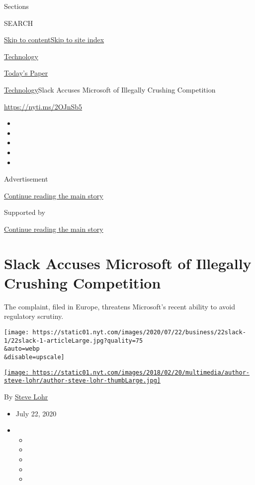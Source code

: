 Sections

SEARCH

\protect\hyperlink{site-content}{Skip to
content}\protect\hyperlink{site-index}{Skip to site index}

\href{https://www.nytimes.com/section/technology}{Technology}

\href{https://myaccount.nytimes.com/auth/login?response_type=cookie\&client_id=vi}{}

\href{https://www.nytimes.com/section/todayspaper}{Today's Paper}

\href{/section/technology}{Technology}\textbar{}Slack Accuses Microsoft
of Illegally Crushing Competition

\url{https://nyti.ms/2OJnSb5}

\begin{itemize}
\item
\item
\item
\item
\item
\end{itemize}

Advertisement

\protect\hyperlink{after-top}{Continue reading the main story}

Supported by

\protect\hyperlink{after-sponsor}{Continue reading the main story}

\hypertarget{slack-accuses-microsoft-of-illegally-crushing-competition}{%
\section{Slack Accuses Microsoft of Illegally Crushing
Competition}\label{slack-accuses-microsoft-of-illegally-crushing-competition}}

The complaint, filed in Europe, threatens Microsoft's recent ability to
avoid regulatory scrutiny.

\texttt{[image: https://static01.nyt.com/images/2020/07/22/business/22slack-1/22slack-1-articleLarge.jpg?quality=75\\\&auto=webp\\\&disable=upscale]}

\href{https://www.nytimes.com/by/steve-lohr}{\texttt{[image: https://static01.nyt.com/images/2018/02/20/multimedia/author-steve-lohr/author-steve-lohr-thumbLarge.jpg]}}

By \href{https://www.nytimes.com/by/steve-lohr}{Steve Lohr}

\begin{itemize}
\item
  July 22, 2020
\item
  \begin{itemize}
  \item
  \item
  \item
  \item
  \item
  \end{itemize}
\end{itemize}

